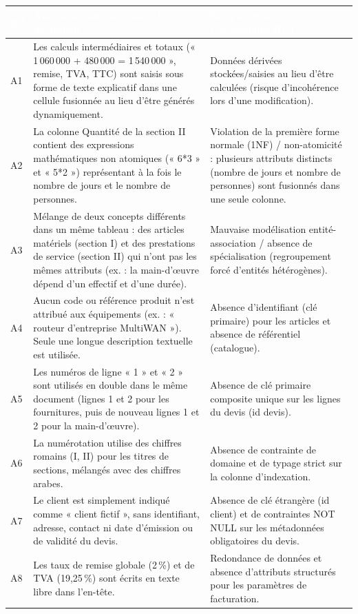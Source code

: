\documentclass[11pt,a4paper]{article}
\newcommand{\entete}[1]{\textcolor{white}{\textbf{#1}}}
\begin{document}
\begin{longtable}{|C{1cm}|L{7.4cm}|L{6.2cm}|}
\hline
{}
\entete{N\textsuperscript{o}} & \entete{Anomalie constatée dans le document} &
\entete{Nom du problème (vocabulaire BD)} \\
\hline
\endhead
A1 & Les calculs intermédiaires et totaux (« 1\,060\,000 + 480\,000 =
     1\,540\,000 », remise, TVA, TTC) sont saisis sous forme de texte
     explicatif dans une cellule fusionnée au lieu d'être générés
     dynamiquement.
   & Données dérivées stockées/saisies au lieu d'être calculées (risque
     d'incohérence lors d'une modification). \\ \hline
A2 & La colonne Quantité de la section II contient des expressions
     mathématiques non atomiques (« 6*3 » et « 5*2 ») représentant à la fois
     le nombre de jours et le nombre de personnes.
   & Violation de la première forme normale (1NF) / non-atomicité : plusieurs
     attributs distincts (nombre de jours et nombre de personnes) sont
     fusionnés dans une seule colonne. \\ \hline
A3 & Mélange de deux concepts différents dans un même tableau : des articles
     matériels (section I) et des prestations de service (section II) qui
     n'ont pas les mêmes attributs (ex. : la main-d'œuvre dépend d'un effectif
     et d'une durée).
   & Mauvaise modélisation entité-association / absence de spécialisation
     (regroupement forcé d'entités hétérogènes). \\ \hline
A4 & Aucun code ou référence produit n'est attribué aux équipements (ex. :
     « routeur d'entreprise MultiWAN »). Seule une longue description
     textuelle est utilisée.
   & Absence d'identifiant (clé primaire) pour les articles et absence de
     référentiel (catalogue). \\ \hline
A5 & Les numéros de ligne « 1 » et « 2 » sont utilisés en double dans le même
     document (lignes 1 et 2 pour les fournitures, puis de nouveau lignes 1
     et 2 pour la main-d'œuvre).
   & Absence de clé primaire composite unique sur les lignes du devis
     (id devis). \\ \hline
A6 & La numérotation utilise des chiffres romains (I, II) pour les titres de
     sections, mélangés avec des chiffres arabes.
   & Absence de contrainte de domaine et de typage strict sur la colonne
     d'indexation. \\ \hline
A7 & Le client est simplement indiqué comme « client fictif », sans
     identifiant, adresse, contact ni date d'émission ou de validité du devis.
   & Absence de clé étrangère (id client) et de contraintes NOT NULL sur les
     métadonnées obligatoires du devis. \\ \hline
A8 & Les taux de remise globale (2\,\%) et de TVA (19,25\,\%) sont écrits en
     texte libre dans l'en-tête.
   & Redondance de données et absence d'attributs structurés pour les
     paramètres de facturation. \\ \hline
\end{longtable}
\end{document}
